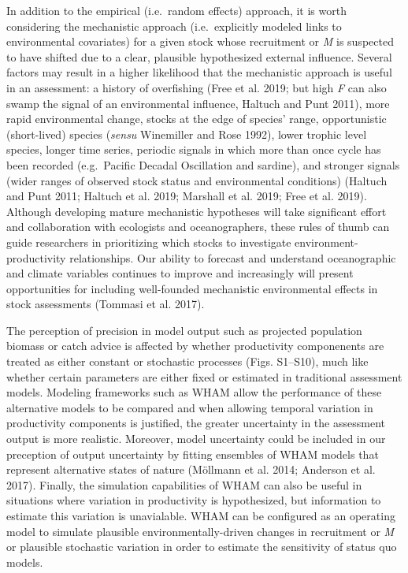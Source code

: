\documentclass[]{article}
\begin{document}
In addition to the empirical (i.e.~random effects) approach, it is worth
considering the mechanistic approach (i.e.~explicitly modeled links to
environmental covariates) for a given stock whose recruitment or
\emph{M} is suspected to have shifted due to a clear, plausible
hypothesized external influence. Several factors may result in a higher
likelihood that the mechanistic approach is useful in an assessment: a
history of overfishing (Free et al. 2019; but high \emph{F} can also
swamp the signal of an environmental influence, Haltuch and Punt 2011),
more rapid environmental change, stocks at the edge of species' range,
opportunistic (short-lived) species (\emph{sensu} Winemiller and Rose
1992), lower trophic level species, longer time series, periodic signals
in which more than once cycle has been recorded (e.g.~Pacific Decadal
Oscillation and sardine), and stronger signals (wider ranges of observed
stock status and environmental conditions) (Haltuch and Punt 2011;
Haltuch et al. 2019; Marshall et al. 2019; Free et al. 2019). Although
developing mature mechanistic hypotheses will take significant effort
and collaboration with ecologists and oceanographers, these rules of
thumb can guide researchers in prioritizing which stocks to investigate
environment-productivity relationships. Our ability to forecast and
understand oceanographic and climate variables continues to improve and
increasingly will present opportunities for including well-founded
mechanistic environmental effects in stock assessments (Tommasi et al.
2017).

The perception of precision in model output such as projected population
biomass or catch advice is affected by whether productivity componenents
are treated as either constant or stochastic processes (Figs. S1--S10),
much like whether certain parameters are either fixed or estimated in
traditional assessment models. Modeling frameworks such as WHAM allow
the performance of these alternative models to be compared and when
allowing temporal variation in productivity components is justified, the
greater uncertainty in the assessment output is more realistic.
Moreover, model uncertainty could be included in our preception of
output uncertainty by fitting ensembles of WHAM models that represent
alternative states of nature (Möllmann et al. 2014; Anderson et al.
2017). Finally, the simulation capabilities of WHAM can also be useful
in situations where variation in productivity is hypothesized, but
information to estimate this variation is unavialable. WHAM can be
configured as an operating model to simulate plausible
environmentally-driven changes in recruitment or \emph{M} or plausible
stochastic variation in order to estimate the sensitivity of status quo
models.
\end{document}
